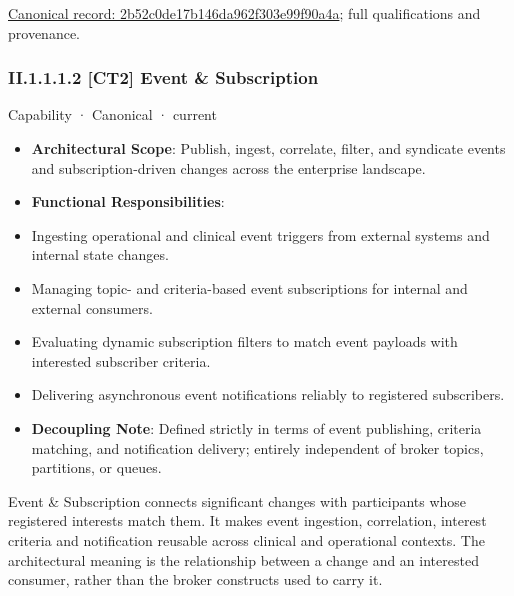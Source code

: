 {\footnotesize \href{../../../../continuum/strategy/capability/2b52c0de17b146da962f303e99f90a4a.md}{Canonical record: 2b52c0de17b146da962f303e99f90a4a}; full qualifications and provenance.}\par
\subsubsection*{II.1.1.1.2 [CT2] Event \& Subscription}
\label{navigation:II.1.1.1.2}

\label{element:b768b129971e4bf5bccc03d33d2fcb4e}
{\small Capability · Canonical · current}\par

\begin{itemize}


\item \textbf{Architectural Scope}: Publish, ingest, correlate, filter, and syndicate events and subscription-driven changes across the enterprise landscape.

\item \textbf{Functional Responsibilities}:

\item Ingesting operational and clinical event triggers from external systems and internal state changes.

\item Managing topic- and criteria-based event subscriptions for internal and external consumers.

\item Evaluating dynamic subscription filters to match event payloads with interested subscriber criteria.

\item Delivering asynchronous event notifications reliably to registered subscribers.

\item \textbf{Decoupling Note}: Defined strictly in terms of event publishing, criteria matching, and notification delivery; entirely independent of broker topics, partitions, or queues.

\end{itemize}


Event \& Subscription connects significant changes with participants whose registered interests match them. It makes event ingestion, correlation, interest criteria and notification reusable across clinical and operational contexts. The architectural meaning is the relationship between a change and an interested consumer, rather than the broker constructs used to carry it.



